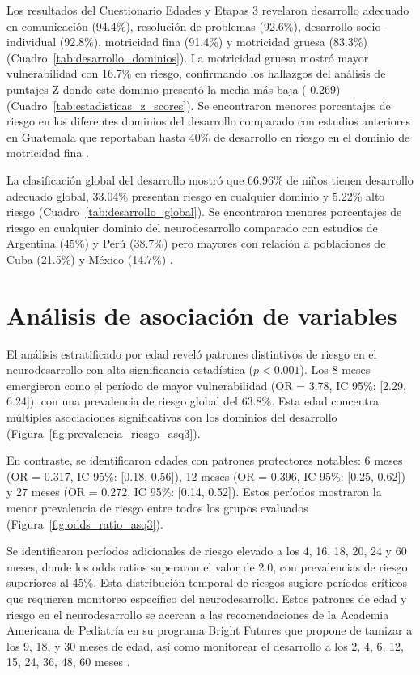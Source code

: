 Los resultados del Cuestionario Edades y Etapas 3 revelaron desarrollo adecuado
en comunicación (94.4\%),  resolución de problemas (92.6\%), desarrollo
socio-individual (92.8\%),  motricidad fina (91.4\%) y motricidad gruesa
(83.3\%)  (Cuadro~\ref{tab:desarrollo_dominios}). La motricidad gruesa mostró
mayor  vulnerabilidad con 16.7\% en riesgo, confirmando los hallazgos del
análisis de puntajes Z donde este dominio presentó la media más baja (-0.269) 
(Cuadro~\ref{tab:estadisticas_z_scores}). Se encontraron menores porcentajes de riesgo en los diferentes dominios del desarrollo comparado con estudios anteriores en Guatemala que reportaban hasta 40\% de desarrollo en riesgo en el dominio de motricidad fina \cite{Angulo2023}.

La clasificación global del desarrollo mostró que 66.96\% de niños tienen 
desarrollo adecuado global, 33.04\% presentan riesgo en cualquier dominio y 
5.22\% alto riesgo (Cuadro~\ref{tab:desarrollo_global}). Se encontraron menores porcentajes de riesgo en cualquier dominio del neurodesarrollo comparado con estudios de Argentina (45\%) y Perú (38.7\%) pero mayores con relación a poblaciones de Cuba (21.5\%) y México (14.7\%)
\cite{GuadarramaCelaya2011,Kyerematen2014,CarlosOliva2020,RicardoGarcell2022}.

\section{Análisis de asociación de variables}
El análisis estratificado por edad reveló patrones distintivos de riesgo en el 
neurodesarrollo con alta significancia estadística ($p<0.001$). Los 8 meses 
emergieron como el período de mayor vulnerabilidad (OR = 3.78, IC 95\%: 
[2.29, 6.24]), con una prevalencia de riesgo global del 63.8\%. Esta edad 
concentra múltiples asociaciones significativas con los dominios del desarrollo
(Figura~\ref{fig:prevalencia_riesgo_asq3}).

En contraste, se identificaron edades con patrones protectores notables: 6 meses 
(OR = 0.317, IC 95\%: [0.18, 0.56]), 12 meses (OR = 0.396, IC 95\%: [0.25, 0.62]) 
y 27 meses (OR = 0.272, IC 95\%: [0.14, 0.52]). Estos períodos mostraron la 
menor prevalencia de riesgo entre todos los grupos evaluados
(Figura~\ref{fig:odds_ratio_asq3}).

Se identificaron períodos adicionales de riesgo elevado a los 4, 16, 18, 20, 24 
y 60 meses, donde los odds ratios superaron el valor de 2.0, con prevalencias 
de riesgo superiores al 45\%. Esta distribución temporal de riesgos sugiere 
períodos críticos que requieren monitoreo específico del neurodesarrollo.
Estos patrones de edad y riesgo en el neurodesarrollo se acercan a las
recomendaciones de la Academia Americana de Pediatría en su programa Bright
Futures que propone de tamizar a los 9, 18, y 30 meses de edad, así como monitorear el desarrollo a los 2, 4, 6, 12, 15, 24, 36, 48, 60 meses \cite{Lipkin2020}. 

